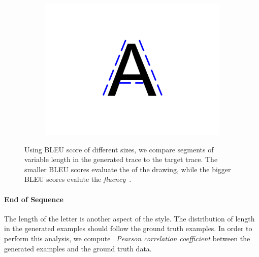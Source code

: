 \begin{figure}[!htbp]
\begin{subfigure}{0.3\textwidth}
        \includegraphics[scale=0.3, trim={10cm 7cm 10cm 7cm},clip]{images/gbem/bleu_score_3.png}
    \end{subfigure}

    \caption{Using BLEU score of different sizes, we compare segments of variable length in the generated trace to the target trace. The smaller BLEU scores evaluate the  of the drawing, while the bigger BLEU scores evalute the \textit{fluency}~\citep{papineni2002bleu}.}
    \label{fig:bleu_score}
\end{figure}

\paragraph{End of Sequence} The length of the letter is another aspect of the style. The distribution of length in the generated examples should follow the ground truth examples. In order to perform this analysis, we compute ~\textit{Pearson correlation coefficient} between the generated examples and the ground truth data.

